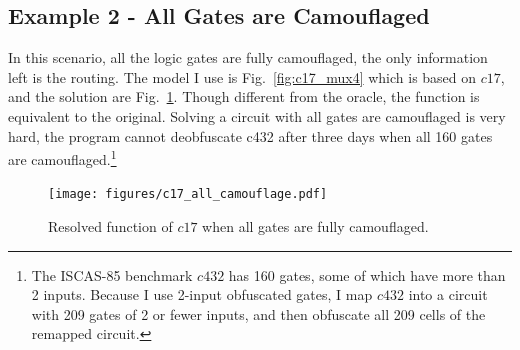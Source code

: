 \documentclass[thesis]{umassthesis}  %
\begin{document}
\subsection{Example 2 - All Gates are Camouflaged}
In this scenario, all the logic gates are fully camouflaged, the only information left is the routing. The model I use is Fig.~\ref{fig:c17_mux4} which is based on $c17$, and the solution are Fig.~\ref{fig:c17_all}. Though different from the oracle, the function is equivalent to the original. Solving a circuit with all gates are camouflaged is very hard, the program cannot deobfuscate c432 after three days when all 160 gates are camouflaged.\footnote{The ISCAS-85 benchmark $c432$ has 160 gates, some of which have more than 2 inputs. Because I use 2-input obfuscated gates, I map $c432$ into a circuit with 209 gates of 2 or fewer inputs, and then obfuscate all 209 cells of the remapped circuit.}



\begin{figure}[htb] 
\begin{center}
\texttt{[image: figures/c17\_all\_camouflage.pdf]}
\caption{Resolved function of $c17$ when all gates are fully camouflaged.}
\label{fig:c17_all}
\end{center}
\end{figure}

\end{document}
